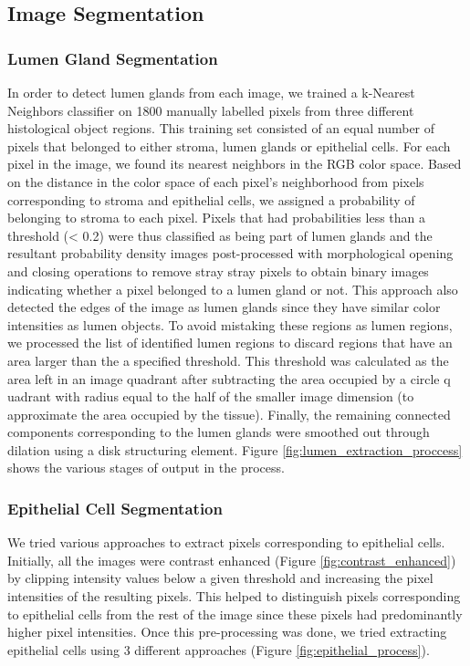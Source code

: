 \subsection{Image Segmentation}

\subsubsection{Lumen Gland Segmentation}

In order to detect lumen glands from each image, we trained a k-Nearest Neighbors classifier on 1800 manually labelled pixels from three different histological object regions. This training set consisted of an equal number of pixels that belonged to either stroma, lumen glands or epithelial cells. For each pixel in the image, we found its nearest neighbors in the RGB color space. Based on the distance in the color space of each pixel's neighborhood from pixels corresponding to stroma and epithelial cells, we assigned a probability of belonging to stroma to each pixel. Pixels that had probabilities less than a threshold (< 0.2) were thus classified as being part of lumen glands and the resultant probability density images post-processed with morphological opening and closing operations to remove stray stray pixels to obtain binary images indicating whether a pixel belonged to a lumen gland or not. This approach also detected the edges of the image as lumen glands since they have similar color intensities as lumen objects. To avoid mistaking these regions as lumen regions, we processed the list of identified lumen regions to discard regions that have
an area larger than the a specified threshold. This threshold was calculated as the area left in an image
quadrant after subtracting the area occupied by a circle q
uadrant with radius equal to the half of the smaller image dimension (to approximate the area occupied by the tissue). Finally, the remaining connected components corresponding to the lumen glands were smoothed out through dilation using a disk structuring element. Figure \ref{fig:lumen_extraction_proccess} shows the various stages of output in the process.

\subsubsection{Epithelial Cell Segmentation}

We tried various approaches to extract pixels corresponding to epithelial cells. Initially, all the images were contrast enhanced (Figure \ref{fig:contrast_enhanced}) by clipping intensity values below a given threshold and increasing the pixel intensities of the resulting pixels. This helped to distinguish pixels corresponding to epithelial cells from the rest of the image since these pixels had predominantly higher pixel intensities. Once this pre-processing was done, we tried extracting epithelial cells using 3 different approaches (Figure \ref{fig:epithelial_process}).

